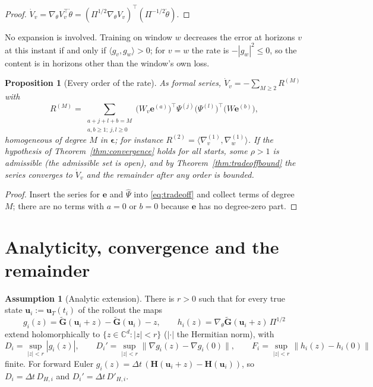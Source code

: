 \documentclass[11pt]{article}
\newtheorem{proposition}{Proposition}
\theoremstyle{definition}
\newtheorem{assumption}{Assumption}
\theoremstyle{remark}
\newcommand{\uu}{\mathbf{u}}
\newcommand{\ee}{\mathbf{e}}
\newcommand{\Gt}{\tilde{\mathbf{G}}}
\newcommand{\Hop}{\mathbf{H}}
\newcommand{\eps}{\bm{\epsilon}}
\newcommand{\dt}{\Delta t}
\newcommand{\Psih}{\hat\Psi}
\begin{document}
\begin{proof}
$\dot V_v=\nabla_\theta V_v^\top\dot\theta=(\Pi^{1/2}\nabla_\theta V_v)^\top(\Pi^{-1/2}\dot\theta)$.
\end{proof}

No expansion is involved.
Training on window $w$ decreases the error at horizons $v$ at this instant if and only if $\langle g_v,g_w\rangle>0$; for $v=w$ the rate is $-|g_w|^2\le0$, so the content is in horizons other than the window's own loss.

\begin{proposition}[Every order of the rate]\label{prop:rateorders}
As formal series, $\dot V_v=-\sum_{M\ge2}R^{(M)}$ with
\begin{equation}\label{eq:RM}
R^{(M)}=\sum_{\substack{a+j+l+b=M\\ a,b\ge1;\ j,l\ge0}}\big(W_v\ee^{(a)}\big)^\top\Psi^{(j)}\big(\Psi^{(l)}\big)^\top\big(W\ee^{(b)}\big),
\end{equation}
homogeneous of degree $M$ in $\eps$; for instance $R^{(2)}=\langle\nabla^{(1)}_v,\nabla^{(1)}_w\rangle$.
If the hypothesis of Theorem~\ref{thm:convergence} holds for all starts, some $\rho>1$ is admissible (the admissible set is open), and by Theorem~\ref{thm:tradeoffbound} the series converges to $\dot V_v$ and the remainder after any order is bounded.
\end{proposition}

\begin{proof}
Insert the series for $\ee$ and $\Psih$ into \eqref{eq:tradeoff} and collect terms of degree $M$; there are no terms with $a=0$ or $b=0$ because $\ee$ has no degree-zero part.
\end{proof}

\section{Analyticity, convergence and the remainder}\label{sec:analytic}

\begin{assumption}[Analytic extension]\label{ass:analytic}
There is $r>0$ such that for every true state $\uu_i:=\uu_T(t_i)$ of the rollout the maps
\[
g_i(z)=\Gt(\uu_i+z)-\Gt(\uu_i)-z,\qquad h_i(z)=\nabla_\theta\Gt(\uu_i+z)\,\Pi^{1/2}
\]
extend holomorphically to $\{z\in\mathbb C^d:|z|<r\}$ ($|\cdot|$ the Hermitian norm), with
\[
D_i=\sup_{|z|<r}|g_i(z)|,\qquad D_i'=\sup_{|z|<r}\|\nabla g_i(z)-\nabla g_i(0)\|,\qquad F_i=\sup_{|z|<r}\|h_i(z)-h_i(0)\|
\]
finite.
For forward Euler $g_i(z)=\dt\,(\Hop(\uu_i+z)-\Hop(\uu_i))$, so $D_i=\dt\,D_{H,i}$ and $D_i'=\dt\,D'_{H,i}$.
\end{assumption}
\end{document}
